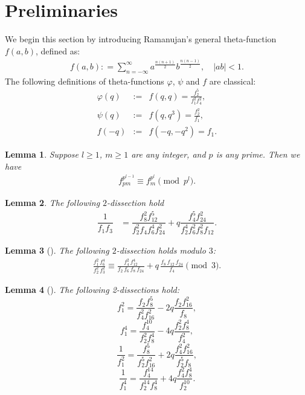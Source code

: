 \documentclass[10pt,a4paper]{amsart}
\newtheorem{lma}{Lemma}[section]
\numberwithin{equation}{section}
\begin{document}
	\section{Preliminaries}
	\noindent We begin this section by introducing Ramanujan's general theta-function $f(a,b)$, defined as:
	\begin{align}
		f(a,b): = \sum_{n=-\infty}^{\infty} a^{\frac{n(n+1)}{2}} b^{\frac{n(n-1)}{2}}, \quad |ab| < 1.
	\end{align}
	The following definitions of theta-functions $\varphi$, $\psi$ and $f$ are classical:
	\begin{eqnarray}
		\varphi(q)&:=&f(q,q)= \frac{f_2^5}{f_1^2f_4^2},\\
		\psi(q)&:=&f(q,q^3) =\frac{f_2^2}{f_1},\\
		f(-q)&:=&f(-q,-q^2)=f_1.
	\end{eqnarray}
	\begin{lma}
		Suppose $l \geq 1$, $m \geq 1$ are any integer, and $p$ is any prime. Then we have
		\begin{align}\label{bt}
			f^{p^{l-1}}_{pm} \equiv f_{m}^{p^{l}} \pmod {p^l}.
		\end{align}
	\end{lma}
	\begin{lma}\cite{NBK}\label{l2}
		The following $2$-dissection hold
		\begin{align}
			\dfrac{1}{f_1f_3}&=\dfrac{f_8^2f_{12}^5}{f_2^2f_4f_6^4f_{24}^2}+q\dfrac{f_4^5f_{24}^2}{f_2^4f_6^2f_8^2f_{12}}.\label{1byf1f3}
		\end{align}
	\end{lma}
	\begin{lma}[{\cite{xia2013analogues}}]\label{l2b}
		The following $2$-dissection holds modulo $3$:
		\begin{align}
			\frac{f_1^2\,f_6^4}{f_2^2\,f_3^2}
			\equiv
			\frac{f_4^2\,f_{12}^4}{f_2\,f_6\,f_8\,f_{24}}
			+q\,\frac{f_8\,f_{12}\,f_{24}}{f_4}
			\pmod{3}.\label{f12byf33}
		\end{align}
	\end{lma}
	\begin{lma} [{\cite[Entry~25]{berndt2012ramanujan}}] The following 2-dissections hold: 
		\begin{equation}\label{f12}
			f_1^2 =\frac{f_2 f_8^5}{f_4^2 f_{16}^2}
			-2q\frac{f_2 f_{16}^2}{f_8},
		\end{equation}
		\begin{equation}\label{f14}
			f_1^4 =\frac{f_4^{10}}{f_2^2 f_{8}^4}
			-4q\frac{f_2^2 f_{8}^4}{f_4^2},
		\end{equation}
		\begin{equation}\label{1byf12}
			\frac{1}{f_1^2} =\frac{f_8^5}{f_2^5 f_{16}^2}
			+2q\frac{f_4^2 f_{16}^2}{f_2^5 f_8},
		\end{equation}
		\begin{equation}\label{1byf14}
			\frac{1}{f_1^4} =\frac{f_4^{14}}{f_2^{14} f_{8}^4}
			+4q\frac{f_4^2 f_{8}^4}{f_2^{10}}.
		\end{equation}
	\end{lma}
\end{document}
